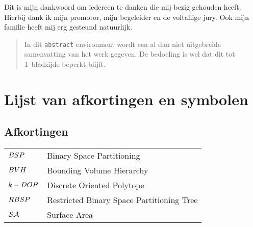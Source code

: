 \documentclass[master=cws,masteroption=mmc]{kulemt}
\begin{document}
\begin{preface}
  Dit is mijn dankwoord om iedereen te danken die mij bezig gehouden heeft.
  Hierbij dank ik mijn promotor, mijn begeleider en de voltallige jury.
  Ook mijn familie heeft mij erg gesteund natuurlijk.
\end{preface}

\tableofcontents*

\begin{abstract}
  In dit \texttt{abstract} environment wordt een al dan niet uitgebreide
  samenvatting van het werk gegeven. De bedoeling is wel dat dit tot
  1~bladzijde beperkt blijft.

  \lipsum[1]
\end{abstract}

\listoffiguresandtables
\chapter{Lijst van afkortingen en symbolen}
\section*{Afkortingen}
\begin{flushleft}
  \renewcommand{\arraystretch}{1.1}
  \begin{tabularx}{\textwidth}{@{}p{20mm}X@{}}
    $BSP$ & Binary Space Partitioning \\
    $BVH$ & Bounding Volume Hierarchy \\
    $k-DOP$ & Discrete Oriented Polytope \\ %
    $RBSP$ & Restricted Binary Space Partitioning Tree \\
    $\mathcal{SA}$   & Surface Area \\
  \end{tabularx}
\end{flushleft}
\end{document}
